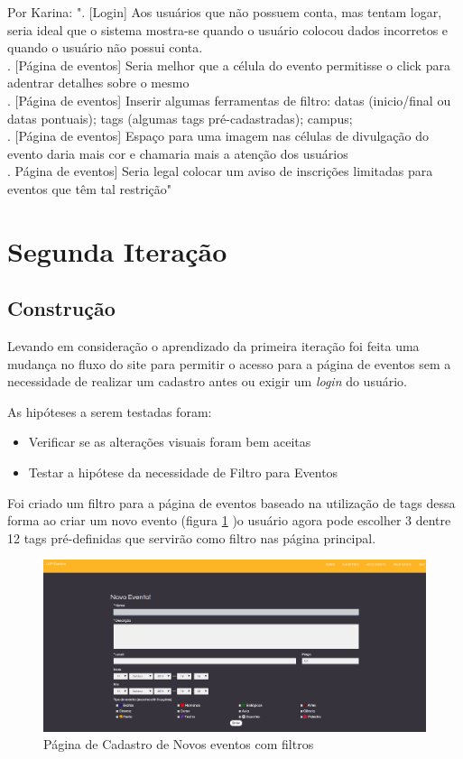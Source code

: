 \begin{itemize}
\par Por Karina: ". [Login] Aos usuários que não possuem conta, mas tentam logar, seria ideal que o sistema mostra-se quando o usuário colocou dados incorretos e quando o usuário não possui conta.
\\
. [Página de eventos] Seria melhor que a célula do evento permitisse o click para adentrar detalhes sobre o mesmo
\\
. [Página de eventos] Inserir algumas ferramentas de filtro: datas (inicio/final ou datas pontuais); tags (algumas tags pré-cadastradas); campus;
\\
. [Página de eventos] Espaço para uma imagem nas células de divulgação do evento daria mais cor e chamaria mais a atenção dos usuários
\\
. Página de eventos] Seria legal colocar um aviso de inscrições limitadas para eventos que têm tal restrição"

\end{itemize}
\section{Segunda Iteração}
\subsection{Construção}
\par Levando em consideração o aprendizado da primeira iteração foi feita uma mudança no fluxo do site para permitir o acesso para a página de eventos sem a necessidade de realizar um cadastro antes ou exigir um \emph{login} do usuário.
\par As hipóteses a serem testadas foram:
\begin{itemize}
\item Verificar se as alterações visuais foram bem aceitas
\item Testar a hipótese da necessidade de Filtro para Eventos
\end{itemize}
\par Foi criado um filtro para a página de eventos baseado na utilização de tags dessa forma ao criar um novo evento (figura \ref{fig:event_newv2} )o usuário agora pode escolher 3 dentre 12 tags pré-definidas que servirão como filtro nas página principal.
        \begin{figure}[htb]
		\includegraphics[width=15cm]{figuras/event_newv2}
		\caption{\label{fig:event_newv2} Página de Cadastro de Novos eventos com filtros}
		\end{figure}

